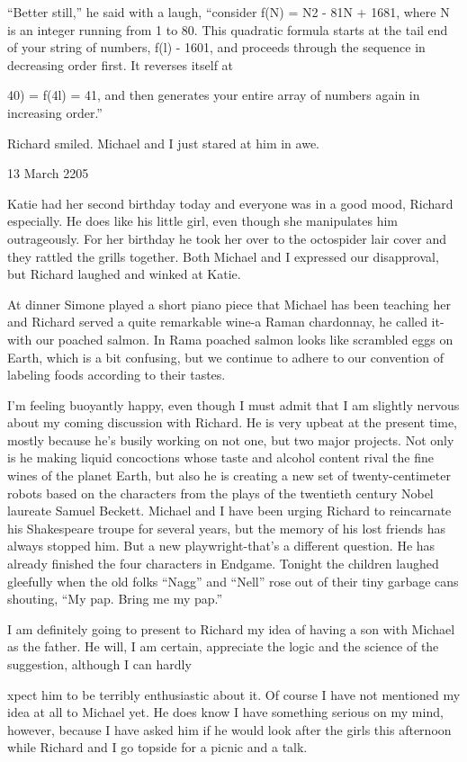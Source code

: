 \documentclass[]{article}
\begin{document}
“Better still,” he said with a laugh, “consider f(N) = N2 - 81N + 1681, where N is an integer running from 1 to 80. This quadratic formula starts at the tail end of your string of numbers, f(l) - 1601, and proceeds through the sequence in decreasing order first. It reverses itself at

40) = f(4l) = 41, and then generates your entire array of numbers again in increasing order.”

Richard smiled. Michael and I just stared at him in awe.

13 March 2205

Katie had her second birthday today and everyone was in a good mood, Richard especially. He does like his little girl, even though she manipulates him outrageously. For her birthday he took her over to the octospider lair cover and they rattled the grills together. Both Michael and I expressed our disapproval, but Richard laughed and winked at Katie.

At dinner Simone played a short piano piece that Michael has been teaching her and Richard served a quite remarkable wine-a Raman chardonnay, he called it-with our poached salmon. In Rama poached salmon looks like scrambled eggs on Earth, which is a bit confusing, but we continue to adhere to our convention of labeling foods according to their tastes.

I’m feeling buoyantly happy, even though I must admit that I am slightly nervous about my coming discussion with Richard. He is very upbeat at the present time, mostly because he’s busily working on not one, but two major projects. Not only is he making liquid concoctions whose taste and alcohol content rival the fine wines of the planet Earth, but also he is creating a new set of twenty-centimeter robots based on the characters from the plays of the twentieth century Nobel laureate Samuel Beckett. Michael and I have been urging Richard to reincarnate his Shakespeare troupe for several years, but the memory of his lost friends has always stopped him. But a new playwright-that’s a different question. He has already finished the four characters in Endgame. Tonight the children laughed gleefully when the old folks “Nagg” and “Nell” rose out of their tiny garbage cans shouting, “My pap. Bring me my pap.”

I am definitely going to present to Richard my idea of having a son with Michael as the father. He will, I am certain, appreciate the logic and the science of the suggestion, although I can hardly

xpect him to be terribly enthusiastic about it. Of course I have not mentioned my idea at all to Michael yet. He does know I have something serious on my mind, however, because I have asked him if he would look after the girls this afternoon while Richard and I go topside for a picnic and a talk.
\end{document}
